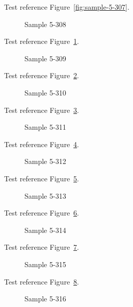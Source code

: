 Test reference Figure~\ref{fig:sample-5-307}.

\begin{figure}[tbhp]
\caption{Sample 5-308}
\label{fig:sample-5-308}
\end{figure}

Test reference Figure~\ref{fig:sample-5-308}.

\begin{figure}[tbhp]
\caption{Sample 5-309}
\label{fig:sample-5-309}
\end{figure}

Test reference Figure~\ref{fig:sample-5-309}.

\begin{figure}[tbhp]
\caption{Sample 5-310}
\label{fig:sample-5-310}
\end{figure}

Test reference Figure~\ref{fig:sample-5-310}.

\begin{figure}[tbhp]
\caption{Sample 5-311}
\label{fig:sample-5-311}
\end{figure}

Test reference Figure~\ref{fig:sample-5-311}.

\begin{figure}[tbhp]
\caption{Sample 5-312}
\label{fig:sample-5-312}
\end{figure}

Test reference Figure~\ref{fig:sample-5-312}.

\begin{figure}[tbhp]
\caption{Sample 5-313}
\label{fig:sample-5-313}
\end{figure}

Test reference Figure~\ref{fig:sample-5-313}.

\begin{figure}[tbhp]
\caption{Sample 5-314}
\label{fig:sample-5-314}
\end{figure}

Test reference Figure~\ref{fig:sample-5-314}.

\begin{figure}[tbhp]
\caption{Sample 5-315}
\label{fig:sample-5-315}
\end{figure}

Test reference Figure~\ref{fig:sample-5-315}.

\begin{figure}[tbhp]
\caption{Sample 5-316}
\label{fig:sample-5-316}
\end{figure}

